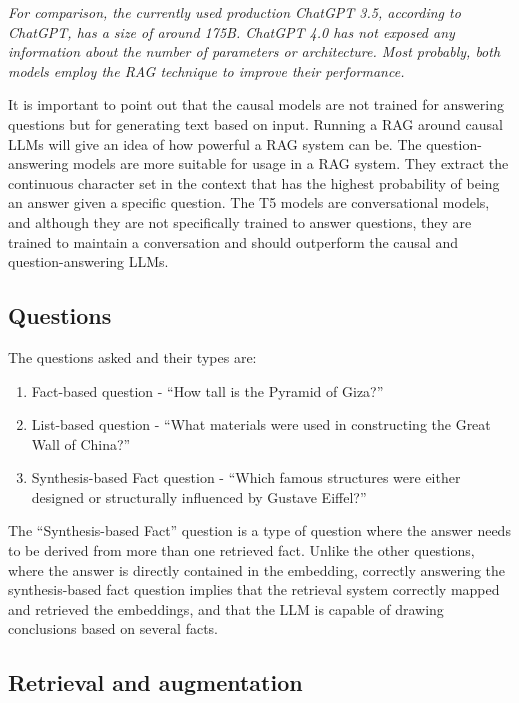 \documentclass{wseas}
\begin{document}
\emph{For comparison, the currently used production ChatGPT 3.5,
according to ChatGPT, has a size of around 175B. ChatGPT 4.0 has not
exposed any information about the number of parameters or architecture.
Most probably, both models employ the RAG technique to improve their
performance.}

It is important to point out that the causal models are not trained for
answering questions but for generating text based on input. Running a
RAG around causal LLMs will give an idea of how powerful a RAG system
can be. The question-answering models are more suitable for usage in a
RAG system. They extract the continuous character set in the context
that has the highest probability of being an answer given a specific
question. The T5 models are conversational models, and although they are
not specifically trained to answer questions, they are trained to
maintain a conversation and should outperform the causal and
question-answering LLMs.

\subsection{Questions}

The questions asked and their types are:

\begin{enumerate}
\def\labelenumi{\arabic{enumi}.}
\item
  Fact-based question - ``How tall is the Pyramid of Giza?''
\item
  List-based question - ``What materials were used in constructing the
  Great Wall of China?''
\item
  Synthesis-based Fact question - ``Which famous structures were either
  designed or structurally influenced by Gustave Eiffel?''
\end{enumerate}

The ``Synthesis-based Fact'' question is a type of question where the
answer needs to be derived from more than one retrieved fact. Unlike the
other questions, where the answer is directly contained in the
embedding, correctly answering the synthesis-based fact question implies
that the retrieval system correctly mapped and retrieved the embeddings,
and that the LLM is capable of drawing conclusions based on several
facts.


\subsection{Retrieval and
augmentation}
\end{document}
